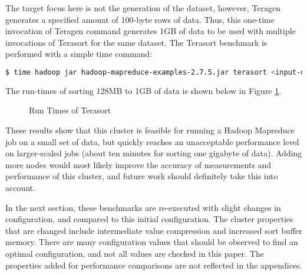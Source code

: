 \documentclass[10pt,journal,compsoc,float]{IEEEtran}
\begin{document}
The target focus here is not the generation of the dataset, however, Teragen generates a specified amount of 100-byte rows of data. Thus, this one-time invocation of Teragen command generates 1GB of data to be used with multiple invocations of Terasort for the same dataset. The Terasort benchmark is performed with a simple time command:

\begin{lstlisting}[language=bash, otherkeywords={$}]
$ time hadoop jar hadoop-mapreduce-examples-2.7.5.jar terasort <input-dir> <output-dir>
\end{lstlisting}

The run-times of sorting 128MB to 1GB of data is shown below in Figure \ref{fig:Terasort}.

\sortdata

\begin{figure}[H]
	\centering
	\caption{Run Times of Terasort}
	\label{fig:Terasort}
\end{figure}

These results show that this cluster is feasible for running a Hadoop Mapreduce job on a small set of data, but quickly reaches an unacceptable performance level on larger-scaled jobs (about ten minutes for sorting one gigabyte of data). Adding more nodes would most likely improve the accuracy of measurements and performance of this cluster, and future work should definitely take this into account.

In the next section, these benchmarks are re-executed with slight changes in configuration, and compared to this initial configuration. The cluster properties that are changed include intermediate value compression and increased sort buffer memory. There are many configuration values that should be observed to find an optimal configuration, and not all values are checked in this paper. The properties added for performance comparisons are not reflected in the appendices.
\end{document}
